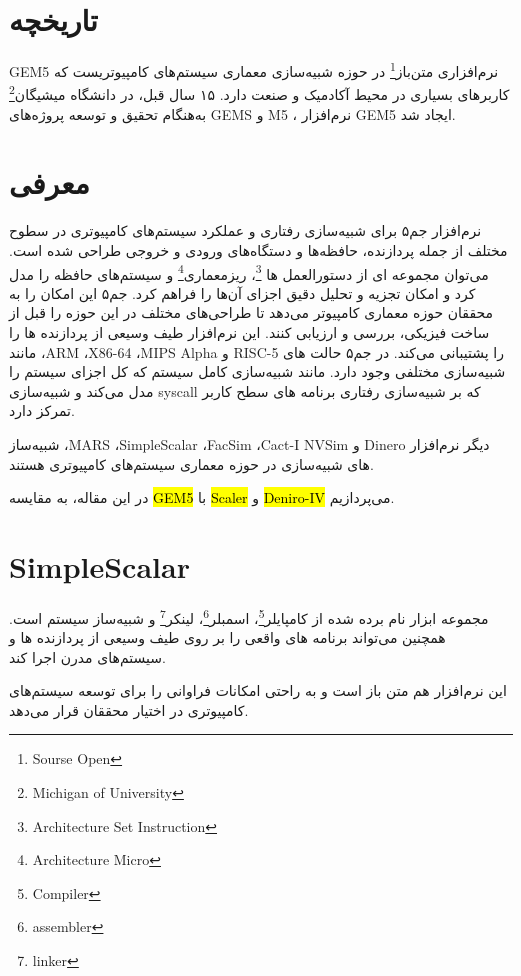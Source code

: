 \documentclass[12pt]{exam}
\begin{document}
\begin{multicols}{2}
	
	\section{تاریخچه}
	GEM5 نرم‌افزاری متن‌باز\footnote{Sourse Open} در حوزه شبیه‌سازی معماری سیستم‌های کامپیوتریست که کاربر‌های بسیاری در محیط آکادمیک و صنعت دارد. ۱۵ سال قبل، در دانشگاه میشیگان\footnote{Michigan of University} به‌هنگام تحقیق و توسعه پروژه‌های GEMS و M5 ، نرم‌افزار GEM5 ایجاد شد.
	
	
	
	\section{معرفی}
	نرم‌افزار جم۵ برای شبیه‌سازی رفتاری و عملکرد سیستم‌های کامپیوتری در سطوح مختلف از جمله پردازنده، حافظه‌ها و دستگاه‌های ورودی و خروجی طراحی شده است. می‌توان مجموعه ای از دستور‌العمل ها \footnote{Architecture Set Instruction}، ریزمعماری\footnote{Architecture Micro} و سیستم‌های حافظه را مدل کرد و امکان تجزیه و تحلیل دقیق اجزای آن‌ها را فراهم کرد. جم۵ این امکان را به محققان حوزه معماری کامپیوتر می‌دهد تا طراحی‌های مختلف در این حوزه را قبل از ساخت فیزیکی، بررسی و ارزیابی کنند. این نرم‌افزار طیف وسیعی از پردازنده ها را مانند ،ARM ،X86-64 ،MIPS Alpha و RISC-5 را پشتیبانی می‌کند. در جم۵ حالت های شبیه‌سازی مختلفی وجود دارد. مانند شبیه‌سازی کامل سیستم که کل اجزای سیستم را مدل می‌کند و شبیه‌سازی syscall که بر شبیه‌سازی رفتاری برنامه های سطح کاربر تمرکز دارد.
	
	شبیه‌ساز ،MARS ،SimpleScalar ،FacSim ،Cact-I NVSim و Dinero
	دیگر نرم‌افزار های شبیه‌سازی در حوزه معماری سیستم‌های کامپیوتری هستند.
	
	در این مقاله، به مقایسه \hl{GEM5} با \hl{Scaler} و \hl{Deniro-IV} می‌پردازیم.
	
	
	
	\section{SimpleScalar}
	مجموعه ابزار نام برده شده از کامپایلر\footnote{Compiler}، اسمبلر\footnote{assembler}، لینکر\footnote{linker} و شبیه‌ساز سیستم است. همچنین می‌تواند برنامه های واقعی را بر روی طیف وسیعی از پردازنده ها و سیستم‌های مدرن اجرا کند.
	
	این نرم‌افزار هم متن باز است و به راحتی امکانات فراوانی را برای توسعه سیستم‌های کامپیوتری در اختیار محققان قرار می‌دهد.
	

\end{multicols}
\end{document}
